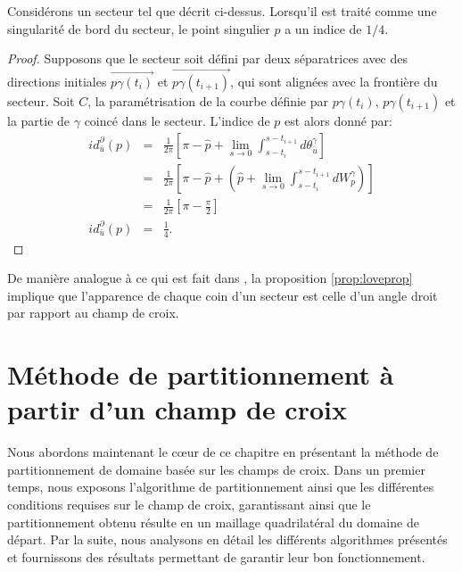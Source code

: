 \begin{proposition}
\label{prop:loveprop}
Considérons un secteur tel que décrit ci-dessus. Lorsqu'il est traité comme une singularité de bord du secteur, le point singulier $p$ a un indice de $1/4$.
\end{proposition}

\begin{proof}
Supposons que le secteur soit défini par deux séparatrices avec des directions initiales $\overrightarrow{p\gamma(t_i)}$ et $\overrightarrow{p\gamma(t_{i+1})}$, qui sont alignées avec la frontière du secteur. Soit $C$, la paramétrisation de la courbe définie par $p\gamma(t_i)$, $p\gamma(t_{i+1})$ et la partie de $\gamma$ coincé dans le secteur. L'indice de $p$ est alors donné par:
\begin{eqnarray*}
id^\partial_{\bar{u}}(p)&=&\frac{1}{2\pi}\left[\pi-\hat{p}+\lim\limits_{s\rightarrow 0}\int_{s-t_i}^{s-t_{i+1}}d\theta_{\bar{u}}^\gamma\right]\\
&=&\frac{1}{2\pi}\left[\pi-\hat{p}+\left(\hat{p}+\lim\limits_{s\rightarrow 0}\int_{s-t_i}^{s-t_{i+1}}dW_p^\gamma\right)\right]\\
&=&\frac{1}{2\pi}\left[\pi-\frac{\pi}{2}\right]\\
id^\partial_{\bar{u}}(p)&=&\frac{1}{4}.
\end{eqnarray*}
\end{proof}

De manière analogue à ce qui est fait dans \cite{viertel2019approach}, la proposition \ref{prop:loveprop} implique que l'apparence de chaque coin d'un secteur est celle d'un angle droit par rapport au champ de croix.

\section{Méthode de partitionnement à partir d'un champ de croix}

Nous abordons maintenant le cœur de ce chapitre en présentant la méthode de partitionnement de domaine basée sur les champs de croix. Dans un premier temps, nous exposons l'algorithme de partitionnement ainsi que les différentes conditions requises sur le champ de croix, garantissant ainsi que le partitionnement obtenu résulte en un maillage quadrilatéral du domaine de départ. Par la suite, nous analysons en détail les différents algorithmes présentés et fournissons des résultats permettant de garantir leur bon fonctionnement.

